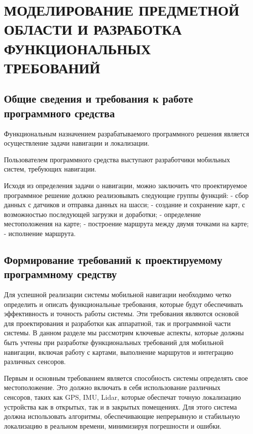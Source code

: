 \section{МОДЕЛИРОВАНИЕ ПРЕДМЕТНОЙ ОБЛАСТИ И РАЗРАБОТКА ФУНКЦИОНАЛЬНЫХ
ТРЕБОВАНИЙ}

\subsection{Общие сведения и требования к работе программного средства}

Функциональным назначением разрабатываемого программного решения является
осуществление задачи навигации и локализации.

Пользователем программного средства выступают разработчики мобильных систем,
требующих навигации.

Исходя из определения задачи о навигации, можно заключить что проектируемое
программное решение должно реализовывать следующие группы функций:
- сбор данных с датчиков и отправка данных на шасси;
- создание и сохранение карт, с возможностью последующей загрузки и доработки;
- определение местоположения на карте;
- построение маршрута между двумя точками на карте;
- исполнение маршрута.




\subsection{Формирование требований к проектируемому программному средству}

Для успешной реализации системы мобильной навигации необходимо четко определить
и описать функциональные требования, которые будут обеспечивать эффективность и
точность работы системы. Эти требования являются основой для проектирования и
разработки как аппаратной, так и программной части системы. В данном разделе мы
рассмотрим ключевые аспекты, которые должны быть учтены при разработке
функциональных требований для мобильной навигации, включая работу с картами,
выполнение маршрутов и интеграцию различных сенсоров.

Первым и основным требованием является способность системы определять свое
местоположение. Это должно включать в себя использование различных сенсоров,
таких как GPS, IMU, Lidar, которые обеспечат точную локализацию устройства как в
открытых, так и в закрытых помещениях. Для этого система должна использовать
алгоритмы, обеспечивающие непрерывную и стабильную локализацию в реальном
времени, минимизируя погрешности и ошибки.

